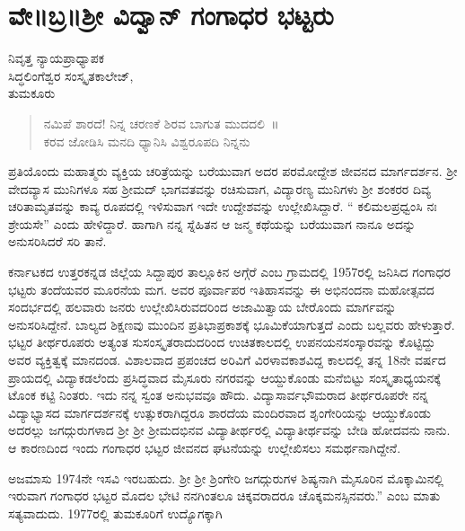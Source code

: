 {\fontsize{14}{16}\selectfont
\chapter{ವೇ॥ಬ್ರ॥ಶ್ರೀ ವಿದ್ವಾನ್ ಗಂಗಾಧರ ಭಟ್ಟರು}

\begin{center}
\smallskip
ನಿವೃತ್ತ  \enginline{-}  ನ್ಯಾಯಪ್ರಾಧ್ಯಾಪಕ\\
ಸಿದ್ಧಲಿಂಗೆಶ್ವರ ಸಂಸ್ಕೃತಕಾಲೇಜ್,\\
ತುಮಕೂರು
\addrule
\end{center}
\begin{verse}
ನಮಿಪೆ ಶಾರದೆ! ನಿನ್ನ ಚರಣಕೆ ಶಿರವ ಬಾಗುತ ಮುದದಲಿ~॥\\
ಕರವ ಜೋಡಿಸಿ ಮನದಿ ಧ್ಯಾನಿಸಿ ವಿಶ್ವರೂಪದಿ ನಿನ್ನನು\\
\end{verse}

ಪ್ರತಿಯೊಂದು ಮಹಾತ್ಮರು ವ್ಯಕ್ತಿಯ ಚರಿತ್ರೆಯನ್ನು ಬರೆಯುವಾಗ ಅದರ ಪರಮೋದ್ದೇಶ ಜೀವನದ ಮಾರ್ಗದರ್ಶನ. ಶ್ರೀ ವೇದವ್ಯಾಸ ಮುನಿಗಳೂ ಸಹ ಶ್ರೀಮದ್ ಭಾಗವತವನ್ನು ರಚಿಸುವಾಗ, ವಿದ್ಯಾರಣ್ಯ ಮುನಿಗಳು ಶ್ರೀ ಶಂಕರರ ದಿವ್ಯ ಚರಿತಾಮೃತವನ್ನು ಕಾವ್ಯ ರೂಪದಲ್ಲಿ ಇಳಿಸುವಾಗ ಇದೇ ಉದ್ದೇಶವನ್ನು ಉಲ್ಲೇಖಿಸಿದ್ದಾರೆ. “ ಕಲಿಮಲಪ್ರಧ್ವಂಸಿ ನಃ ಶ್ರೇಯಸೇ” ಎಂದು ಹೇಳಿದ್ದಾರೆ. ಹಾಗಾಗಿ ನನ್ನ ಸ್ನೆಹಿತನ ಆ ಜನ್ಮ ಕಥೆಯನ್ನು ಬರೆಯುವಾಗ ನಾನೂ ಅದನ್ನು ಅನುಸರಿಸಿದರೆ ಸರಿ ತಾನೆ.

ಕರ್ನಾಟಕದ ಉತ್ತರಕನ್ನಡ ಜಿಲ್ಲೆಯ ಸಿದ್ದಾಪುರ ತಾಲ್ಲೂಕಿನ ಅಗ್ಗೆರೆ ಎಂಬ ಗ್ರಾಮದಲ್ಲಿ 1957ರಲ್ಲಿ ಜನಿಸಿದ ಗಂಗಾಧರ ಭಟ್ಟರು ತಂದೆಯವರ ಮೂರನೆಯ ಮಗ. ಅವರ ಪೂರ್ವಾಪರ ಇತಿಹಾಸವನ್ನು ಈ ಅಭಿನಂದನಾ ಮಹೋತ್ಸವದ ಸಂದರ್ಭದಲ್ಲಿ  ಹಲವಾರು ಜನರು ಉಲ್ಲೇಖಿಸಿರುವದರಿಂದ ಅಜಾಮಿತ್ವಾಯ ಬೇರೊಂದು ಮಾರ್ಗವನ್ನು ಅನುಸರಿಸಿದ್ದೇನೆ. ಬಾಲ್ಯದ ಶಿಕ್ಷಣವು ಮುಂದಿನ ಪ್ರತಿಭಾಪ್ರಕಾಶಕ್ಕೆ ಭೂಮಿಕೆಯಾಗುತ್ತದೆ ಎಂದು ಬಲ್ಲವರು ಹೇಳುತ್ತಾರೆ. ಭಟ್ಟರ ತೀರ್ಥರೂಪರು ಅತ್ಯಂತ ಸುಸಂಸ್ಕೃತರಾದುದರಿಂದ ಉಚಿತಕಾಲದಲ್ಲಿ ಉಪನಯನಸಂಸ್ಕಾರವನ್ನು ಕೊಟ್ಟಿದ್ದು ಅವರ ವ್ಯಕ್ತಿತ್ವಕ್ಕೆ ಮಾನದಂಡ. ವಿಶಾಲವಾದ ಪ್ರಪಂಚದ ಅರಿವಿಗೆ ವಿರಳಾವಕಾಶವಿದ್ದ ಕಾಲದಲ್ಲಿ ತನ್ನ 18ನೇ ವರ್ಷದ ಪ್ರಾಯದಲ್ಲಿ ವಿದ್ಯಾಕಡಲೆಂದು ಪ್ರಸಿದ್ಧವಾದ ಮೈಸೂರು ನಗರವನ್ನು ಆಯ್ದುಕೊಂಡು ಮನೆಬಿಟ್ಟು ಸಂಸ್ಕೃತಾಧ್ಯಯನಕ್ಕೆ ಟೊಂಕ ಕಟ್ಟಿ ನಿಂತರು. ಇದು ನನ್ನ ಸ್ವಂತ ಅನುಭವವೂ ಹೌದು. ವಿದ್ಯಾಸಾರ್ವಭೌಮರಾದ ತೀರ್ಥರೂಪರೇ ನನ್ನ ವಿದ್ಯಾಭ್ಯಾಸದ ಮಾರ್ಗದರ್ಶನಕ್ಕೆ ಉತ್ಸುಕರಾಗಿದ್ದರೂ ಶಾರದೆಯ ಮಂದಿರವಾದ ಶೃಂಗೇರಿಯನ್ನು ಆಯ್ದುಕೊಂಡು ಅದರಲ್ಲು ಜಗದ್ಗುರುಗಳಾದ ಶ್ರೀ ಶ್ರೀ ಶ್ರೀಮದಭಿನವ ವಿದ್ಯಾತೀರ್ಥರಲ್ಲಿ ವಿದ್ಯಾತೀರ್ಥವನ್ನು ಬೇಡಿ ಹೋದವನು ನಾನು. ಆ ಕಾರಣದಿಂದ ಇಂದು ಗಂಗಾಧರ ಭಟ್ಟರ ಜೀವನದ ಘಟನೆಯನ್ನು ಉಲ್ಲೇಖಿಸಲು ಸಮರ್ಥನಾಗಿದ್ದೇನೆ.

ಅಜಮಾಸು 1974ನೇ ಇಸವಿ ಇರಬಹುದು. ಶ್ರೀ ಶ್ರೀ ಶ್ರಿಂಗೇರಿ ಜಗದ್ಗುರುಗಳ ಶಿಷ್ಯನಾಗಿ ಮೈಸೂರಿನ ಮೊಕ್ಕಾಮಿನಲ್ಲಿ ಇರುವಾಗ ಗಂಗಾಧರ ಭಟ್ಟರ ಮೊದಲ ಭೇಟಿ ನನಗಿಂತಲೂ ಚಿಕ್ಕವರಾದರೂ ಚೊಕ್ಕಮನಸ್ಸಿನವರು.”  ಎಂಬ ಮಾತು ಸತ್ಯವಾದುದು. 1977ರಲ್ಲಿ ತುಮಕೂರಿಗೆ ಉದ್ಯೊಗಕ್ಕಾಗಿ

}
